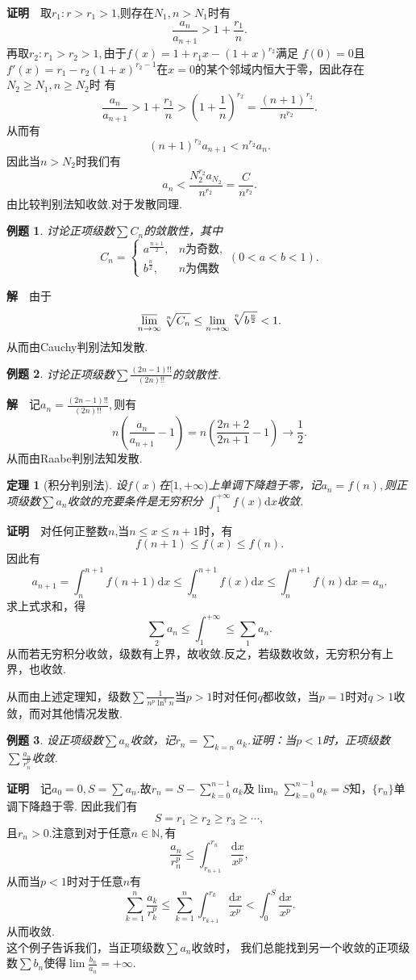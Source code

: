 \documentclass[UTF8]{article}
\newcommand{\dx}{\mathrm{d}x}
\newcommand{\zm}{\textbf{证明}$\quad$}
\newcommand{\jie}{\textbf{解}$\quad$}
\newtheorem{thm}{\hspace{2em}定理}[section]
\newtheorem{exa}{\hspace{2em}例题}[section]
\begin{document}
\zm 取$r_1:r>r_1>1$,则存在$N_1,n>N_1$时有
$$\frac{a_n}{a_{n+1}}>1+\frac{r_1}{n}.$$再取$r_2:r_1>r_2>1,$由于$f(x)=1+r_1x-(1+x)^{r_2}$满足
$f(0)=0$且$f'(x)=r_1-r_2(1+x)^{r_2-1}$在$x=0$的某个邻域内恒大于零，因此存在$N_2\ge N_1,n\ge N_2$时
有$$\frac{a_n}{a_{n+1}}>1+\frac{r_1}{n}>(1+\frac{1}{n})^{r_2}=\frac{(n+1)^{r_2}}{n^{r_2}}.$$
从而有
$$(n+1)^{r_2}a_{n+1}<n^{r_2}a_n.$$
因此当$n>N_2$时我们有
$$a_n<\frac{N_2^{r_2}a_{N_2}}{n^{r_2}}=\frac{C}{n^{r_2}}.$$由比较判别法知收敛.对于发散同理.
\begin{exa}
  讨论正项级数$\sum C_n$的敛散性，其中
  $$C_n=\begin{cases}a^{\frac{n+1}{2}},&n\text{为奇数},\\b^\frac{n}{2},&n\text{为偶数}\end{cases}(0<a<b<1).$$
\end{exa}
\jie 由于
$$\varlimsup_{n\to\infty}\sqrt[n]{C_n}\le\lim_{n\to\infty}\sqrt[n]{b^\frac{n}{2}}<1.$$
从而由Cauchy判别法知发散.
\begin{exa}
  讨论正项级数$\sum\frac{(2n-1)!!}{(2n)!!}$的敛散性.
\end{exa}
\jie 记$a_n=\frac{(2n-1)!!}{(2n)!!},$则有
$$n(\frac{a_n}{a_{n+1}}-1)=n(\frac{2n+2}{2n+1}-1)\to\frac{1}{2}.$$
从而由Raabe判别法知发散.
\begin{thm}[积分判别法]
  设$f(x)$在$[1,+\infty)$上单调下降趋于零，记$a_n=f(n),$则正项级数$\sum a_n$收敛的充要条件是无穷积分
  $\int_1^{+\infty}f(x)\dx$收敛.
\end{thm}
\zm 对任何正整数$n$,当$n\le x\le n+1$时，有
$$f(n+1)\le f(x)\le f(n).$$因此有
$$a_{n+1}=\int_n^{n+1}f(n+1)\dx\le\int_n^{n+1}f(x)\dx\le\int_n^{n+1}f(n)\dx=a_n.$$
求上式求和，得$$\sum_2 a_n\le\int_1^{+\infty}\le \sum_1 a_n.$$
从而若无穷积分收敛，级数有上界，故收敛.反之，若级数收敛，无穷积分有上界，也收敛.

从而由上述定理知，级数$\sum\frac{1}{n^p\ln^qn}$当$p>1$时对任何$q$都收敛，当$p=1$时对$q>1$收敛，而对其他情况发散.
\begin{exa}
  设正项级数$\sum a_n$收敛，记$r_n=\sum_{k=n} a_k$.证明：当$p<1$时，正项级数$\sum\frac{a_n}{r_n^p}$收敛.
\end{exa}
\zm 记$a_0=0,S=\sum a_n.$故$r_n=S-\sum_{k=0}^{n-1}a_k$及$\lim_n\sum_{k=0}^{n-1}a_k=S$知，$\{r_n\}$单调下降趋于零.
因此我们有
$$S=r_1\ge r_2\ge r_3\ge\cdots,$$
且$r_n>0.$注意到对于任意$n\in\mathbb{N},$有
$$\frac{a_n}{r_n^p}\le\int_{r_{n+1}}^{r_n}\frac{\dx}{x^p},$$
从而当$p<1$时对于任意$n$有
$$\sum_{k=1}^n\frac{a_k}{r_k^p}\le\sum_{k=1}^n\int_{r_{k+1}}^{r_k}\frac{\dx}{x^p}<\int_0^S\frac{\dx}{x^p}.$$
从而收敛.\\
这个例子告诉我们，当正项级数$\sum a_n$收敛时，
我们总能找到另一个收敛的正项级数$\sum b_n$使得$\lim\frac{b_n}{a_n}=+\infty.$
\clearpage
\end{document}

